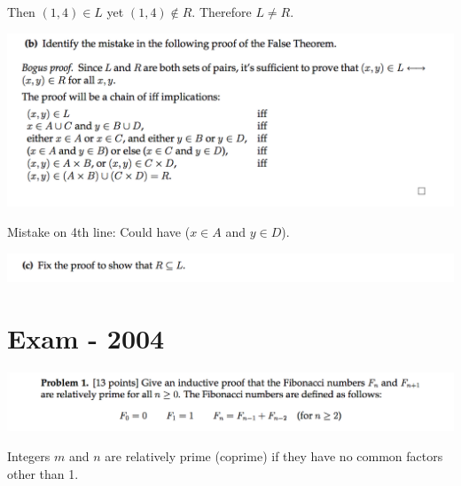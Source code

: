\documentclass[12pt]{article}
\begin{document}
Then $(1,4) \in L$ yet $(1,4) \notin R$. Therefore $L \neq R$.

\begin{mdframed}
\includegraphics[width=400pt]{img/MIT-math-for-cs-2005-set-1-6-b.png}
\end{mdframed}
Mistake on 4th line: Could have ($x \in A$ and $y \in D$).
\newpage



\begin{mdframed}
\includegraphics[width=400pt]{img/MIT-math-for-cs-2005-set-1-6-c.png}
\end{mdframed}

\newpage

\section*{Exam - 2004}

\begin{mdframed}
\includegraphics[width=400pt]{img/MIT-math-for-cs-2004-1.png}
\end{mdframed}

\begin{definition*}
  Integers $m$ and $n$ are relatively prime (coprime) if they have no common factors other than 1.
\end{definition*}
\end{document}
